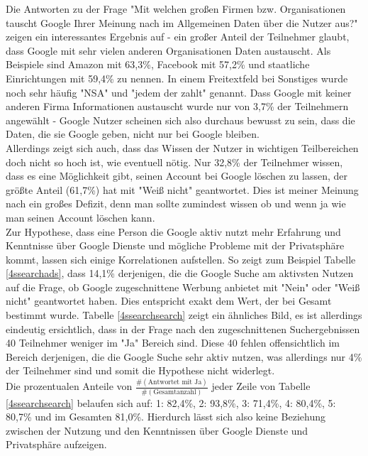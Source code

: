 Die Antworten zu der Frage "Mit welchen großen Firmen bzw. Organisationen tauscht Google Ihrer Meinung nach im Allgemeinen Daten über die Nutzer aus?" zeigen ein interessantes Ergebnis auf - ein großer Anteil der Teilnehmer glaubt, dass Google mit sehr vielen anderen Organisationen Daten austauscht. Als Beispiele sind Amazon mit 63,3\%, Facebook mit 57,2\% und staatliche Einrichtungen mit 59,4\% zu nennen. In einem Freitextfeld bei Sonstiges wurde noch sehr häufig "NSA" und "jedem der zahlt" genannt. Dass Google mit keiner anderen Firma Informationen austauscht wurde nur von 3,7\% der Teilnehmern angewählt - Google Nutzer scheinen sich also durchaus bewusst zu sein, dass die Daten, die sie Google geben, nicht nur bei Google bleiben.\\
Allerdings zeigt sich auch, dass das Wissen der Nutzer in wichtigen Teilbereichen doch nicht so hoch ist, wie eventuell nötig. Nur 32,8\% der  Teilnehmer wissen, dass es eine Möglichkeit gibt, seinen Account bei Google löschen zu lassen, der größte Anteil (61,7\%) hat mit "Weiß nicht" geantwortet. Dies ist meiner Meinung nach ein großes Defizit, denn man sollte zumindest wissen ob und wenn ja wie man seinen Account löschen kann.\\

Zur Hypothese, dass eine Person die Google aktiv nutzt mehr Erfahrung und Kenntnisse über Google Dienste und mögliche Probleme mit der Privatsphäre kommt, lassen sich einige Korrelationen aufstellen. So zeigt zum Beispiel Tabelle \ref{4ssearchads}, dass 14,1\% derjenigen, die die Google Suche am aktivsten Nutzen auf die Frage, ob Google zugeschnittene Werbung anbietet mit "Nein" oder "Weiß nicht" geantwortet haben. Dies entspricht exakt dem Wert, der bei Gesamt bestimmt wurde. Tabelle \ref{4ssearchsearch} zeigt ein ähnliches Bild, es ist allerdings eindeutig ersichtlich, dass in der Frage nach den zugeschnittenen Suchergebnissen 40 Teilnehmer weniger im "Ja" Bereich sind. Diese 40 fehlen offensichtlich im Bereich derjenigen, die die Google Suche sehr aktiv nutzen, was allerdings nur 4\% der Teilnehmer sind und somit die Hypothese nicht widerlegt.\\
Die prozentualen Anteile von $\frac{\#(\text{Antwortet mit Ja})}{\#(\text{Gesamtanzahl})}$ jeder Zeile von Tabelle \ref{4ssearchsearch} belaufen sich auf: 1: 82,4\%, 2: 93,8\%, 3: 71,4\%, 4: 80,4\%, 5: 80,7\% und im Gesamten 81,0\%. Hierdurch lässt sich also keine Beziehung zwischen der Nutzung und den Kenntnissen über Google Dienste und Privatsphäre aufzeigen.

